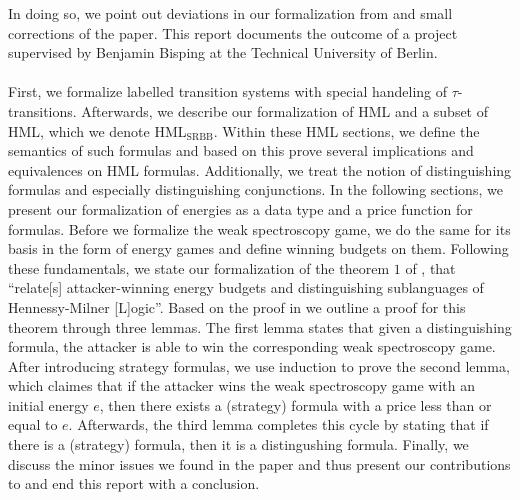 In doing so, we point out deviations in our formalization from and small corrections of the paper. This report documents the outcome of a project supervised by Benjamin Bisping at the Technical University of Berlin. 
\\\\
First, we formalize labelled transition systems with special handeling of $\tau$-transitions.
Afterwards, we describe our formalization of HML and a subset of HML, which we denote HML$_\text{SRBB}$.
Within these HML sections, we define the semantics of such formulas and based on this prove several implications and equivalences on HML formulas.
Additionally, we treat the notion of distinguishing formulas and especially distinguishing conjunctions.
In the following sections, we present our formalization of energies as a data type and a price function for formulas.
Before we formalize the weak spectroscopy game, we do the same for its basis in the form of energy games and define winning budgets on them.
Following these fundamentals, we state our formalization of the theorem $1$ of \cite{bisping2023lineartimebranchingtime}, that ``relate[s] attacker-winning energy budgets and distinguishing sublanguages of Hennessy-Milner [L]ogic''\cite[Abstract]{bisping2023lineartimebranchingtime}. 
Based on the proof in \cite{bisping2023lineartimebranchingtime} we outline a proof for this theorem through three lemmas. 
The first lemma states that given a distinguishing formula, the attacker is able to win the corresponding weak spectroscopy game.
After introducing strategy formulas, we use induction to prove the second lemma, which claimes that if the attacker wins the weak spectroscopy game with an initial energy $e$, then there exists a (strategy) formula with a price less than or equal to $e$.
Afterwards, the third lemma completes this cycle by stating that if there is a (strategy) formula, then it is a distingushing formula.
Finally, we discuss the minor issues we found in the paper and thus present our contributions to \cite{bisping2023lineartimebranchingtime} and end this report with a conclusion.